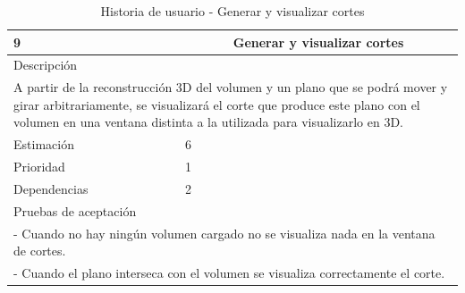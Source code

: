 \begin{table}[H]
	\begin{center}
		\begin{tabular} {|l|c|l|}
			\hline
			9 & \multicolumn{2}{c|}{Generar y visualizar cortes} \\ \hline \hline
			\multicolumn{3}{|l|}{Descripción} \\ \hline
			\multicolumn{3}{|p{12cm}|}{A partir de la reconstrucción 3D del volumen y un plano que se podrá mover y girar arbitrariamente, se visualizará el corte que produce este plano con el volumen en una ventana distinta a la utilizada para visualizarlo en 3D.} \\ \hline
			\multicolumn{2}{|l|}{Estimación} & 6 \\ \hline
			\multicolumn{2}{|l|}{Prioridad} & 1 \\ \hline
			\multicolumn{2}{|l|}{Dependencias} & 2 \\ \hline
			\multicolumn{3}{|l|}{Pruebas de aceptación} \\ \hline
			\multicolumn{3}{|p{12cm}|}{ - Cuando no hay ningún volumen cargado no se visualiza nada en la ventana de cortes.} \\ 
			\multicolumn{3}{|p{12cm}|}{ - Cuando el plano interseca con el volumen se visualiza correctamente el corte.} \\ \hline
		\end{tabular}
	\end{center}
	\caption{Historia de usuario - Generar y visualizar cortes}
	\label{tab:hu_generar_y_visualizar_cortes}
\end{table}

